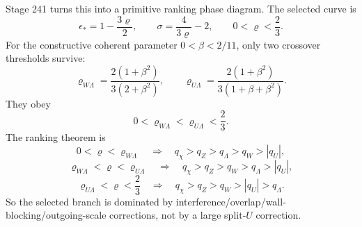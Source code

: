 Stage 241 turns this into a primitive ranking phase diagram.  The selected curve is
\begin{equation}
\label{eq:part07-selected-curve}
\epsilon_* = 1-\frac{3\varrho}{2},
\qquad
\sigma=\frac{4}{3\varrho}-2,
\qquad
0<\varrho<\frac23.
\end{equation}
For the constructive coherent parameter \(0<\beta<2/11\), only two crossover thresholds survive:
\begin{equation}
\label{eq:part07-ranking-thresholds}
\varrho_{W\Lambda}
=
\frac{2(1+\beta^2)}{3(2+\beta^2)},
\qquad
\varrho_{U\Lambda}
=
\frac{2(1+\beta^2)}{3(1+\beta+\beta^2)}.
\end{equation}
They obey
\begin{equation}
\label{eq:part07-threshold-order}
0<\varrho_{W\Lambda}<\varrho_{U\Lambda}<\frac23.
\end{equation}
The ranking theorem is
\begin{equation}
\label{eq:part07-ranking-region-i}
0<\varrho<\varrho_{W\Lambda}
\quad\Longrightarrow\quad
q_\chi>q_Z>q_\Lambda>q_W>|q_U|,
\end{equation}
\begin{equation}
\label{eq:part07-ranking-region-ii}
\varrho_{W\Lambda}<\varrho<\varrho_{U\Lambda}
\quad\Longrightarrow\quad
q_\chi>q_Z>q_W>q_\Lambda>|q_U|,
\end{equation}
\begin{equation}
\label{eq:part07-ranking-region-iii}
\varrho_{U\Lambda}<\varrho<\frac23
\quad\Longrightarrow\quad
q_\chi>q_Z>q_W>|q_U|>q_\Lambda.
\end{equation}
So the selected branch is dominated by interference/overlap/wall-blocking/outgoing-scale corrections, not by a large split-\(U\) correction.

